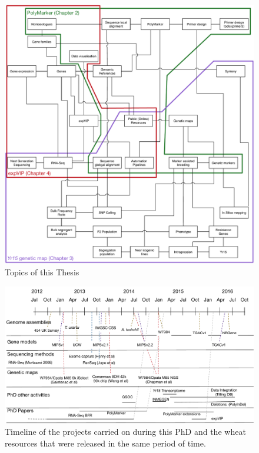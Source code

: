 \begin{figure}
\centering
\includegraphics[width=1\textwidth]{Introduction/RicardoThesisTopics.pdf}
\caption{Topics of this Thesis}
\label{fig:intr:topics}
\end{figure}


\begin{landscape}
 \begin{figure}
  \centering
  \includegraphics[height=0.9\textheight]{Introduction/RicardoPhdTimelineV1.pdf}
  \caption[PhD timeline.]{Timeline of the projects carried on during this PhD and the wheat resources that were released in the same period of time. }
  \label{fig:intro:timeline}
 \end{figure}
\end{landscape}



